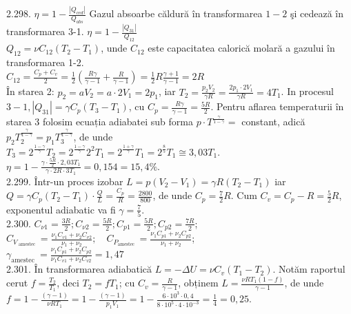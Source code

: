 2.298. $\eta=1-\frac{\left|Q_{c e d}\right|}{Q_{a b s}}$ Gazul absoarbe căldură în transformarea $1-2$ şi cedează în transformarea 3-1. $\eta=1-\frac{\left|Q_{31}\right|}{Q_{12}}$\\ $Q_{12}=\nu C_{12}\left(T_{2}-T_{1}\right)$, unde $C_{12}$ este capacitatea calorică molară a gazului în transformarea 1-2.\\ $C_{12}=\frac{C_{p}+C_{v}}{2}=\frac{1}{2}\left(\frac{R \gamma}{\gamma-1}+\frac{R}{\gamma-1}\right)=\frac{1}{2} R \frac{\gamma+1}{\gamma-1}=2 R$\\ În starea 2: $p_{2}=a V_{2}=a \cdot 2 V_{1}=2 p_{1}$, iar $T_{2}=\frac{p_{2} V_{2}}{\gamma R}=\frac{2 p_{1} \cdot 2 V_{1}}{\gamma R}=4 T_{1}$. In procesul $3-1,\left|Q_{31}\right|=\gamma C_{p}\left(T_{3}-T_{1}\right)$, cu $C_{p}=\frac{R \gamma}{\gamma-1}=\frac{5 R}{2}$. Pentru aflarea temperaturii în starea 3 folosim ecuația adiabatei sub forma $p \cdot T^{\frac{\gamma}{1-\gamma}}=$ constant, adică $p_{2} T_{2}^{\frac{\gamma}{1-\gamma}}=p_{1} T_{3}^{\frac{\gamma}{1-\gamma}}$, de unde\\ $T_{3}=2^{\frac{1-\gamma}{\gamma}} T_{2}=2^{\frac{1-\gamma}{\gamma}} 2^{2} T_{1}=2^{\frac{1+\gamma}{\gamma}} T_{1}=2^{\frac{8}{5}} T_{1} \cong 3,03 T_{1}$. \\ $\eta=1-\frac{\gamma \cdot \frac{5 R}{2} \cdot 2,03 T_{1}}{\gamma \cdot 2 R \cdot 3 T_{1}}=0,154=15,4 \%$.\\

2.299. Într-un proces izobar $L=p\left(V_{2}-V_{1}\right)=\gamma R\left(T_{2}-T_{1}\right)$ iar $Q=\gamma C_{p}\left(T_{2}-T_{1}\right) \cdot \frac{Q}{L}=\frac{C_{p}}{R}=\frac{2800}{800}$, de unde $C_{p}=\frac{7}{2} R$. Cum $C_{v}=C_{p}-R=\frac{5}{2} R$, exponentul adiabatic va fi $\gamma=\frac{7}{5}$.\\

2.300. $C_{\nu 1}=\frac{3 R}{2} ; C_{\nu 2}=\frac{5 R}{2} ; C_{p 1}=\frac{5 R}{2} ; C_{p 2}=\frac{7 R}{2}$;\\ $C_{V_{\text { amestec }}}=\frac{\nu_{1} C_{v 1}+\nu_{2} C_{v 2}}{\nu_{1}+\nu_{2}} ; \quad C_{P_{\text {amestec }}}=\frac{\nu_{1} C_{p 1}+\nu_{2} C_{p 2}}{\nu_{1}+\nu_{2}}$; \\ $\gamma_{\text {amestec }}=\frac{\nu_{1} C_{p 1}+\nu_{2} C_{p 2}}{\nu_{1} C_{v 1}+\nu_{2} C_{v 2}}=1,47$\\

2.301. În transformarea adiabatică $L=-\Delta U=\nu C_{v}\left(T_{1}-T_{2}\right)$. Notăm raportul cerut $f=\frac{T_{2}}{T_{1}}$, deci $T_{2}=f T_{1}$; cu $C_{v}=\frac{R}{\gamma-1}$, obținem $L=\frac{\nu R T_{1}(1-f)}{\gamma-1}$, de unde\\ $f=1-\frac{(\gamma-1)}{\nu R T_{1}}=1-\frac{(\gamma-1)}{p_{1} V_{1}}=1-\frac{6 \cdot 10^{3} \cdot 0,4}{8 \cdot 10^{5} \cdot 4 \cdot 10^{-3}}=\frac{1}{4}=0,25$.\\

